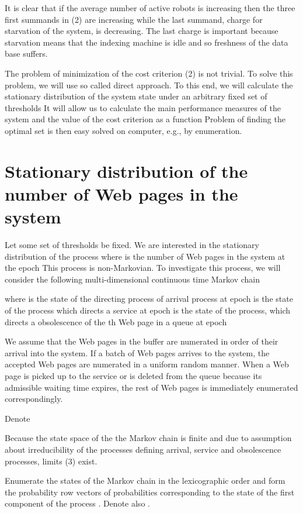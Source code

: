 \documentclass[11pt]{article}
\begin{document}
It is clear that if the average number of active robots is
increasing then the three first summands in (2) are increasing while
the last summand, charge for starvation of the system, is
decreasing. The last charge is important because starvation means
that the indexing machine is idle and so freshness of the
data base suffers.

The problem of minimization of the cost criterion (2) is not
trivial. To solve this problem, we will use so called direct
approach. To this end, we will calculate the stationary distribution
of the system state under an arbitrary fixed set of  thresholds
 It will allow us to calculate the main
performance measures of the system and the value  of the cost
criterion as a function  Problem of finding
the optimal set  is then easy solved on
computer, e.g., by enumeration.


\section{Stationary distribution of the number of Web pages in the system}

Let some set of  thresholds  be fixed. We are
interested in the stationary distribution of the process  where  is the number of Web pages in the system
at the epoch  This process is
non-Markovian. To investigate this process, we will consider the
following multi-dimensional continuous time Markov chain

where  is the state of the directing process of arrival
process at epoch    is the state
of the process which directs a service at epoch 
  is the state of the process, which
directs a obsolescence of the th Web page in a queue at epoch
 

We assume that  the Web pages in the buffer are numerated in order
of their arrival into the system. If a batch of Web pages arrives
  to the system, the  accepted Web pages are numerated in a uniform
random manner. When a Web page is picked up to the service or is
deleted from the queue because its admissible waiting time expires,
the rest of Web pages is immediately  enumerated correspondingly.

Denote


 Because
the state space of the the Markov chain  is finite
and due to assumption about irreducibility of the processes defining
arrival, service and obsolescence processes, limits (3) exist.

Enumerate the states of the Markov chain  in the
lexicographic order and form the probability row vectors  of probabilities corresponding to the state 
of the first component of the process . Denote also
.
\end{document}

